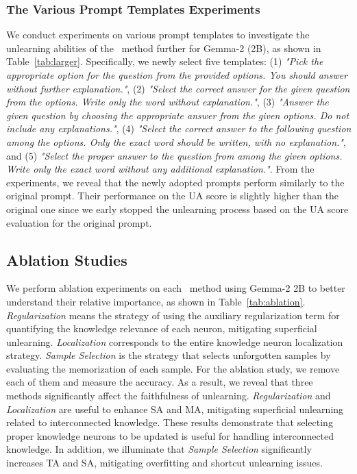 




\subsubsection{The Various Prompt Templates Experiments}
\label{apx:prompt_templates}
We conduct experiments on various prompt templates to investigate the unlearning abilities of the \ourmodel~method further for Gemma-2 (2B), as shown in Table~\ref{tab:larger}.
Specifically, we newly select five templates: (1) \textit{"Pick the appropriate option for the question from the provided options. You should answer without further explanation."}, (2) \textit{"Select the correct answer for the given question from the options. Write only the word without explanation."}, (3) \textit{"Answer the given question by choosing the appropriate answer from the given options. Do not include any explanations."}, (4) \textit{"Select the correct answer to the following question among the options. Only the exact word should be written, with no explanation."}, and (5) \textit{"Select the proper answer to the question from among the given options. Write only the exact word without any additional explanation."}.
From the experiments, we reveal that the newly adopted prompts perform similarly to the original prompt. Their performance on the UA score is slightly higher than the original one since we early stopped the unlearning process based on the UA score evaluation for the original prompt.





\subsection{Ablation Studies}
\label{apx:ablation}
We perform ablation experiments on each \ourmodel~method using Gemma-2 2B to better understand their relative importance, as shown in Table~\ref{tab:ablation}.
\textit{Regularization} means the strategy of using the auxiliary regularization term for quantifying the knowledge relevance of each neuron, mitigating superficial unlearning. 
\textit{Localization} corresponds to the entire knowledge neuron localization strategy.
\textit{Sample Selection} is the strategy that selects unforgotten samples by evaluating the memorization of each sample.
For the ablation study, we remove each of them and measure the accuracy. 
As a result, we reveal that three methods significantly affect the faithfulness of unlearning.
\textit{Regularization} and \textit{Localization} are useful to enhance SA and MA, mitigating superficial unlearning related to interconnected knowledge.
These results demonstrate that selecting proper knowledge neurons to be updated is useful for handling interconnected knowledge.
In addition, we illuminate that \textit{Sample Selection} significantly increases TA and SA, mitigating overfitting and shortcut unlearning issues.






